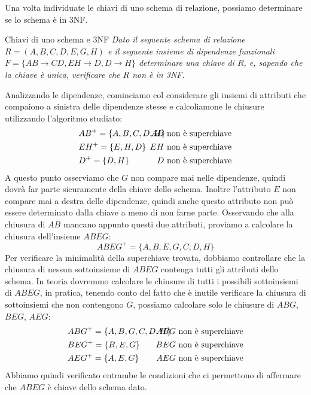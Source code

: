 Una volta individuate le chiavi di uno schema di relazione, possiamo determinare se lo schema è in 3NF.

\begin{Example}{Chiavi di uno schema e 3NF}{}
    \textit{Dato il seguente schema di relazione $R = (A, B, C, D, E, G, H)$ e il seguente insieme di dipendenze funzionali $F = \{ AB\to CD, EH \to D, D \to H \}$ determinare una chiave di $R$, e, sapendo che la chiave è unica, verificare che $R$ non è in 3NF.}

    Analizzando le dipendenze, cominciamo col considerare gli insiemi di attributi che compaiono a  sinistra delle dipendenze stesse e calcoliamone le chiusure utilizzando l'algoritmo studiato:
    \begin{align*}
        &AB^+ = \{A,B,C,D,H\}\hspace{-1cm}&AB\mbox{ non è superchiave}\\
        &EH^+ = \{E,H,D\}\hspace{-1cm}&EH\mbox{ non è superchiave}\\
        &D^+ = \{D,H\}\hspace{-1cm}&D\mbox{ non è superchiave}
    \end{align*}
    A questo punto osserviamo che $G$ non compare mai nelle dipendenze, quindi dovrà far parte sicuramente della chiave dello schema. Inoltre l'attributo $E$ non compare mai a destra delle dipendenze, quindi anche questo attributo non può essere determinato dalla chiave a meno di non farne parte. Osservando che alla chiusura di $AB$ mancano appunto questi due attributi, proviamo a calcolare la chiusura dell'insieme $ABEG$:
    \begin{equation*}
        ABEG^+ = \{A,B,E,G,C,D,H\}
    \end{equation*}
    Per verificare la minimalità della superchiave trovata, dobbiamo controllare che la chiusura di nessun sottoinsieme di $ABEG$ contenga tutti gli attributi dello schema. In teoria dovremmo calcolare le chiusure di tutti i possibili sottoinsiemi di $ABEG$, in pratica, tenendo conto del fatto che è inutile verificare la chiusura di sottoinsiemi che non contengono $G$, possiamo calcolare solo le chiusure di $ABG$, $BEG$, $AEG$:
    \begin{align*}
        &ABG^+ = \{A,B,G,C,D,H\}\hspace{-1cm}&ABG\mbox{ non è superchiave}\\
        &BEG^+ = \{B,E,G\}\hspace{-1cm}&BEG\mbox{ non è superchiave}\\
        &AEG^+ = \{A,E,G\}\hspace{-1cm}&AEG\mbox{ non è superchiave}
    \end{align*}
    Abbiamo quindi verificato entrambe le condizioni che ci permettono di affermare che $ABEG$ è chiave dello schema dato.


\end{Example}
